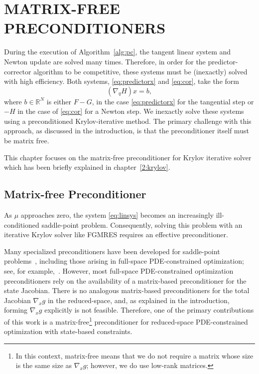  
\chapter{MATRIX-FREE PRECONDITIONERS}\label{chap:linsys}
During the execution of Algorithm~\ref{alg:pc}, the tangent linear system and
Newton update are solved many times.  Therefore, in order for the
predictor-corrector algorithm to be competitive, these systems must be
(inexactly) solved with high efficiency.  Both systems, \eqref{eq:predictorx}
and \eqref{eq:cor}, take the form
\begin{equation}\label{eq:linsys}
  (\nabla_q H) x = b,
\end{equation}
where $b \in
\mathbb{R}^{N}$ is either $F - G$, in the case \eqref{eq:predictorx} for the tangential step or $-H$ in the case of \eqref{eq:cor} for a Newton step.  We inexactly solve these systems using a preconditioned
Krylov-iterative method.  The primary challenge with this approach, as discussed
in the introduction, is that the preconditioner itself must be matrix free.

This chapter focuses on the matrix-free preconditioner for Krylov iterative solver which has been 
briefly explained in chapter~\ref{2:krylov}. 


\section{Matrix-free Preconditioner}\label{sec:matfreepc}
As $\mu$ approaches zero, the system \eqref{eq:linsys} becomes an increasingly
ill-conditioned saddle-point problem.  Consequently, solving this problem with
an iterative Krylov solver like FGMRES requires an effective preconditioner.  

Many specialized preconditioners have been developed for saddle-point
problems~\cite{benzi2005numerical}, including those arising in full-space
PDE-constrained optimization; see, for example,~\cite{Rees2010optimal}.
However, most full-space PDE-constrained optimization preconditioners rely on
the availability of a matrix-based preconditioner for the state Jacobian. There
is no analogous matrix-based preconditioners for the total Jacobian $\nabla_x g$
in the reduced-space, and, as explained in the introduction, forming $\nabla_x
g$ explicitly is not feasible.  Therefore, one of the primary contributions of
this work is a matrix-free\footnote{In this context, matrix-free means that we
  do not require a matrix whose size is the same size as $\nabla_x g$; however,
  we do use low-rank matrices.} preconditioner for reduced-space PDE-constrained
optimization with state-based constraints.

